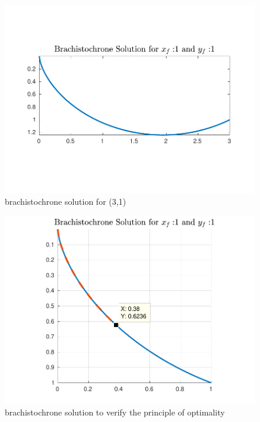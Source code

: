 \documentclass{article}
\begin{document}
\begin{figure}[H]
\centering
\includegraphics [width=4.4in]{f3}
\caption{brachistochrone solution for (3,1)}
\end{figure}
\begin{figure}[H]
\centering
\includegraphics [width=4.4in]{f4}
\caption{brachistochrone solution to verify the principle of
optimality}
\end{figure}
\end{document}
